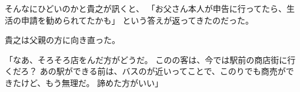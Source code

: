\documentclass[chapter3.tex]{subfiles}
\begin{document}
\begin{CJK}{UTF8}{ipxm}
    そんなにひどいのかと貴之が訊くと、
    「お父さん本人が申告に行ってたら、生活の申請を勧められてたかも」
    という答えが返ってきたのだった。

    貴之は父親の方に向き直った。

    「なあ、そろそろ店をんだ方がどうだ。
    このの客は、今では駅前の商店街に行くだろ？
    あの駅ができる前は、バスのが近いってことで、このりでも商売ができたけど、もう無理だ。
    諦めた方がいい」

    


\end{CJK}
\end{document}
